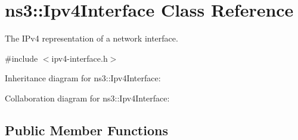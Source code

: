 \hypertarget{classns3_1_1Ipv4Interface}{}\section{ns3\+:\+:Ipv4\+Interface Class Reference}
\label{classns3_1_1Ipv4Interface}


The I\+Pv4 representation of a network interface.  




{\ttfamily \#include $<$ipv4-\/interface.\+h$>$}



Inheritance diagram for ns3\+:\+:Ipv4\+Interface\+:


Collaboration diagram for ns3\+:\+:Ipv4\+Interface\+:
\subsection*{Public Member Functions}
